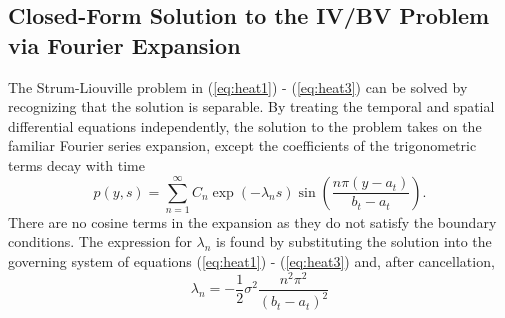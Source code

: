 
\subsection{Closed-Form Solution to the IV/BV Problem via Fourier Expansion}

The Strum-Liouville problem in (\ref{eq:heat1}) - (\ref{eq:heat3}) can be solved by recognizing that the solution is separable. By treating the temporal and spatial differential equations independently, the solution to the problem takes on the familiar Fourier series expansion, except the coefficients of the trigonometric terms decay with time
\begin{equation}
	p(y,s) = \sum_{n=1}^\infty C_{n} \exp\left( -\lambda_n s \right) \sin\left( \frac{n\pi (y- a_t)}{b_t - a_t} \right). \label{eq:trig-expansion}
\end{equation}
There are no cosine terms in the expansion as they do not satisfy the boundary conditions. The expression for $\lambda_n$ is found by substituting the solution into the governing system of equations (\ref{eq:heat1}) - (\ref{eq:heat3}) and, after cancellation, 
\[
	\lambda_n = -\frac{1}{2}\sigma^2 \frac{n^2 \pi^2}{(b_t - a_t)^2}
\]

